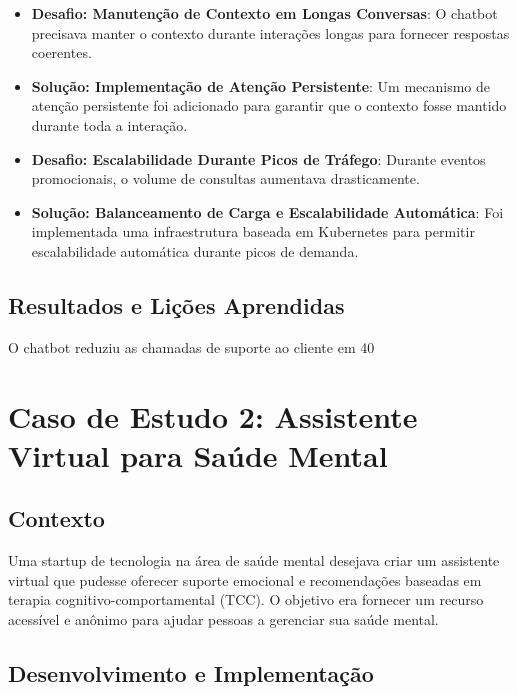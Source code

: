 \documentclass[14pt,a4paper,oneside]{book}
\begin{document}
\begin{itemize}
	\item \textbf{Desafio: Manutenção de Contexto em Longas Conversas}: O chatbot precisava manter o contexto durante interações longas para fornecer respostas coerentes.
	\item \textbf{Solução: Implementação de Atenção Persistente}: Um mecanismo de atenção persistente foi adicionado para garantir que o contexto fosse mantido durante toda a interação.
	\item \textbf{Desafio: Escalabilidade Durante Picos de Tráfego}: Durante eventos promocionais, o volume de consultas aumentava drasticamente.
	\item \textbf{Solução: Balanceamento de Carga e Escalabilidade Automática}: Foi implementada uma infraestrutura baseada em Kubernetes para permitir escalabilidade automática durante picos de demanda.
\end{itemize}

\subsection{Resultados e Lições Aprendidas}

O chatbot reduziu as chamadas de suporte ao cliente em 40%

\section{Caso de Estudo 2: Assistente Virtual para Saúde Mental}

\subsection{Contexto}

Uma startup de tecnologia na área de saúde mental desejava criar um assistente virtual que pudesse oferecer suporte emocional e recomendações baseadas em terapia cognitivo-comportamental (TCC). O objetivo era fornecer um recurso acessível e anônimo para ajudar pessoas a gerenciar sua saúde mental.

\subsection{Desenvolvimento e Implementação}
\end{document}
